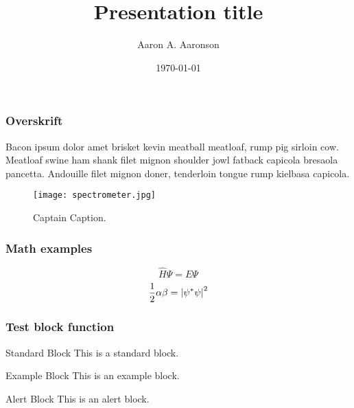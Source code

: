 \documentclass[aspectratio=43,xcolor={rgb}]{beamer}
\title{Presentation title}
\date{\today}
\author{Aaron A. Aaronson}
\begin{document}
\setcounter{page}{1}
\begin{frame}
  \titlepage
\end{frame}

\setcounter{page}{2}
\begin{frame}
  \titlepage
\end{frame}

\setcounter{page}{3}
\setcounter{framenumber}{0} %
\begin{frame}
  \frametitle{Overskrift}
  Bacon ipsum dolor amet brisket kevin meatball meatloaf, rump pig
  sirloin cow. Meatloaf swine ham shank filet mignon shoulder jowl
  fatback capicola bresaola pancetta. Andouille filet mignon doner,
  tenderloin tongue rump kielbasa capicola.
  \begin{figure}[tpbh]
    \centering
    \texttt{[image: spectrometer.jpg]}
    \caption{Captain Caption.}
  \end{figure}
\end{frame}

\begin{frame}
  \frametitle{Math examples}
  \begin{equation}
    \hat{H}\Psi = E\Psi
  \end{equation}
  \begin{equation}
    \frac{1}{2}\alpha\beta = \qty|\psi^*\psi|^2
  \end{equation}
\end{frame}

\begin{frame}
  \frametitle{Test block function}
  \begin{block}{Standard Block}
    This is a standard block.
  \end{block}
  
  \begin{exampleblock}{Example Block}
    This is an example block.
  \end{exampleblock}
  
  \begin{alertblock}{Alert Block}
    This is an alert block.
  \end{alertblock}
\end{frame}

\begin{frame}
\end{frame}
\end{document}
